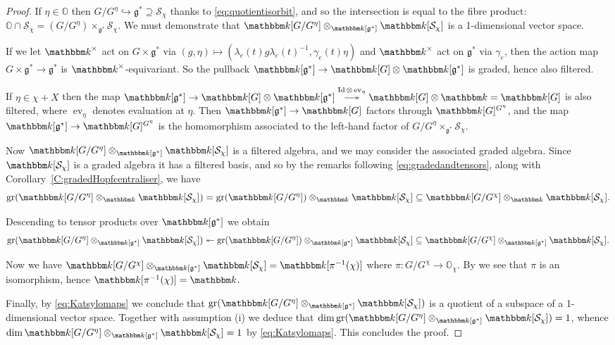 \documentclass[twoside,12pt,reqno]{amsart}
\theoremstyle{remark}
\numberwithin{equation}{section}
\DeclareRobustCommand\longtwoheadrightarrow
{\relbar\joinrel\twoheadrightarrow}
\def\k{{\mathbbm k}}
\def\gr{\operatorname{gr}}
\def\Id{\operatorname{Id}}
\def\O{{\mathbb O}}
\def\g{{\mathfrak g}}
\renewcommand{\S}{\mathcal{S}}
\begin{document}
\begin{proof}
    If $\eta \in \O$ then $G / G^\eta \hookrightarrow \g^* \supseteq \S_\chi$ thanks to \eqref{eq:quotientisorbit}, and so the intersection is equal to the fibre product: $\O \cap \S_\chi = (G/G^\eta) \times_{\g^*} \S_\chi$. We must demonstrate that $\k[G/G^\eta] \otimes_{\k[\g^*]} \k[\S_\chi]$ is a 1-dimensional vector space.

    If we let $\k^\times$ act on $G \times \g^*$ via $(g, \eta) \mapsto (\lambda_e(t) g \lambda_e(t)^{-1}, \gamma_e(t)\eta)$ and $\k^\times$ act on $\g^*$ via $\gamma_e$, 
    then the action map $G \times \g^* \to \g^*$ is $\k^\times$-equivariant. So the pullback $\k[\g^*] \to \k[G] \otimes \k[\g^*]$ is graded, hence also filtered.
    
    If $\eta \in \chi + X$ then the map $\k[\g^*] \to \k[G] \otimes \k[\g^*] \overset{\Id \otimes \operatorname{ev}_\eta}{\longtwoheadrightarrow} \k[G] \otimes \k = \k[G]$ is also filtered, where $\operatorname{ev}_\eta$ denotes evaluation at $\eta$. Then $\k[\g^*] \to \k[G]$ factors through $\k[G]^{G^\eta}$, and the map $\k[\g^*] \to \k[G]^{G^\eta}$ is the homomorphism associated to the left-hand factor of $G/ G^\eta \times_{\g^*} \S_\chi$.

    Now $\k[G/G^\eta] \otimes_{\k[\g^*]} \k[\S_\chi]$ is a filtered algebra, and we may consider the associated graded algebra. Since $\k[\S_\chi]$ is a graded algebra it has a filtered basis, and so by the remarks following \eqref{eq:gradedandtensors}, along with Corollary~\ref{C:gradedHopfcentraliser}, we have $$\gr(\k[G/G^\eta] \otimes_{\k} \k[\S_\chi]) = \gr(\k[G/G^\eta]) \otimes_{\k} \k[\S_\chi] \subseteq \k[G / G^\chi] \otimes_\k \k[\S_\chi].$$

    Descending to tensor products over $\k[\g^*]$ we obtain
    \begin{eqnarray}
    \label{eq:Katsylomaps}
        \gr(\k[G/G^\eta] \otimes_{\k[\g^*]} \k[\S_\chi]) \twoheadleftarrow \gr(\k[G/G^\eta]) \otimes_{\k[\g^*]} \k[\S_\chi] \subseteq \k[G / G^\chi] \otimes_{\k[\g^*]} \k[\S_\chi].
    \end{eqnarray}

    Now we have $\k[G / G^\chi] \otimes_{\k[\g^*]} \k[\S_\chi] = \k[\pi^{-1}(\chi)]$ where $\pi : G / G^\chi \to \O_\chi$. By \cite[§2.2 \& Theorem~2.5]{JaNO} we see that $\pi$ is an isomorphism, hence $\k[\pi^{-1}(\chi)] = \k$.
    
    Finally, by \eqref{eq:Katsylomaps} we conclude that $\gr(\k[G/G^\eta] \otimes_{\k[\g^*]} \k[\S_\chi])$ is a quotient of a subspace of a 1-dimensional vector space. Together with assumption (i) we deduce that $\dim \gr(\k[G/G^\eta] \otimes_{\k[\g^*]} \k[\S_\chi]) =  1$, whence $\dim \k[G/G^\eta] \otimes_{\k[\g^*]} \k[\S_\chi] = 1$ by \eqref{eq:Katsylomaps}. This concludes the proof.
\end{proof}
\end{document}
